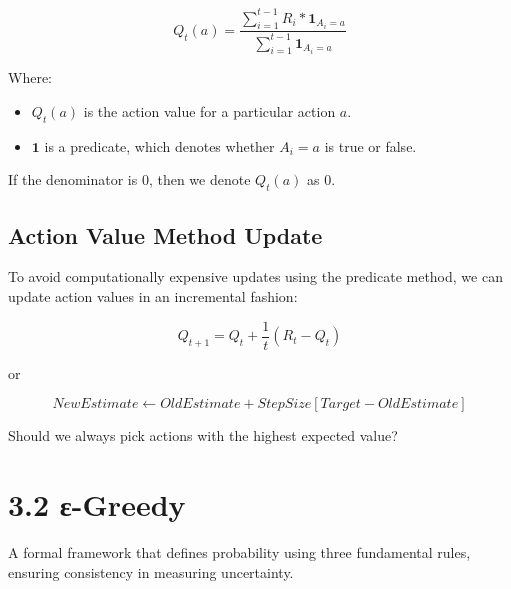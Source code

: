 \documentclass[
  letterpaper,
  DIV=11,
  numbers=noendperiod]{scrreprt}
\providecommand{\tightlist}{%
  \setlength{\itemsep}{0pt}\setlength{\parskip}{0pt}}\usepackage{longtable,booktabs,array}
\begin{document}
\[
Q_t(a) = \frac{\sum_{i=1}^{t-1} R_i * \mathbf{1}_{A_i = a}}{\sum_{i=1}^{t-1} \mathbf{1}_{A_i = a}}
\]

Where:

\begin{itemize}
\tightlist
\item
  \(Q_t(a)\) is the action value for a particular action \(a\).
\item
  \(\mathbf{1}\) is a predicate, which denotes whether \(A_i = a\) is
  true or false.
\end{itemize}

If the denominator is \(0\), then we denote \(Q_t(a)\) as \(0\).

\section{Action Value Method Update}\label{action-value-method-update}

To avoid computationally expensive updates using the predicate method,
we can update action values in an incremental fashion:

\[
Q_{t+1} = Q_t + \frac{1}{t} (R_t - Q_t)
\]

or

\[
NewEstimate \gets OldEstimate + StepSize [Target - OldEstimate]
\]

\begin{tcolorbox}[enhanced jigsaw, arc=.35mm, toprule=.15mm, leftrule=.75mm, colback=white, left=2mm, colframe=quarto-callout-note-color-frame, rightrule=.15mm, opacityback=0, breakable, bottomrule=.15mm]

Should we always pick actions with the highest expected value? 🤔

\end{tcolorbox}

\chapter{3.2 ε-Greedy}\label{ux3b5-greedy}

\begin{tcolorbox}[enhanced jigsaw, arc=.35mm, toprule=.15mm, leftrule=.75mm, colback=white, left=2mm, colframe=quarto-callout-note-color-frame, rightrule=.15mm, opacityback=0, breakable, bottomrule=.15mm]

A formal framework that defines probability using three fundamental
rules, ensuring consistency in measuring uncertainty. 🎲

\end{tcolorbox}
\end{document}
